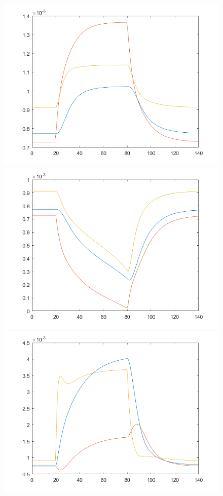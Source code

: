 \begin{figure}[h!]
\centering
\includegraphics[scale=0.3]{../a1.png}\hspace{0.01cm}
\includegraphics[scale=0.3]{../b1.png}\hspace{0.01cm}
\includegraphics[scale=0.3]{../c1.png}\\

\end{figure}

